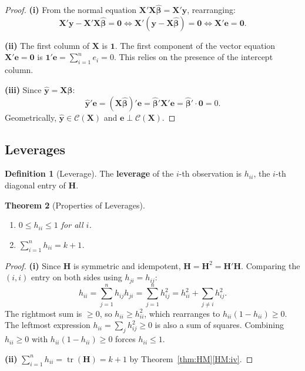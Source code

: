 \documentclass[14pt]{extarticle}
\theoremstyle{plain}
\newtheorem{theorem}{Theorem}[section]
\theoremstyle{definition}
\newtheorem{definition}[theorem]{Definition}
\theoremstyle{remark}
\DeclareMathOperator\tr{tr}
\newcommand{\bX}{\mathbf{X}}
\newcommand{\by}{\mathbf{y}}
\def\bb{\boldsymbol{\beta}}
\newcommand{\bH}{\mathbf{H}}
\newcommand{\bone}{\mathbf{1}}
\newcommand{\bzero}{\mathbf{0}}
\newcommand{\calC}{\mathcal{C}}
\begin{document}
\begin{proof}
\textbf{(i)} From the normal equation $\bX'\bX\hat{\bb} = \bX'\by$, rearranging:
\[
\bX'\by - \bX'\bX\hat{\bb} = \bzero \iff \bX'(\by - \bX\hat{\bb}) = \bzero \iff \bX'\mathbf{e} = \bzero.
\]

\textbf{(ii)} The first column of $\bX$ is $\bone$. The first component of the vector equation $\bX'\mathbf{e} = \bzero$ is $\bone'\mathbf{e} = \sum_{i=1}^{n} e_i = 0$. This relies on the presence of the intercept column.

\textbf{(iii)} Since $\hat{\by} = \bX\hat{\bb}$:
\[
\hat{\by}'\mathbf{e} = (\bX\hat{\bb})'\mathbf{e} = \hat{\bb}'\bX'\mathbf{e} = \hat{\bb}' \cdot \bzero = 0.
\]
Geometrically, $\hat{\by} \in \calC(\bX)$ and $\mathbf{e} \perp \calC(\bX)$.
\end{proof}

\subsection{Leverages}

\begin{definition}[Leverage]\label{def:leverage}
The \textbf{leverage} of the $i$-th observation is $h_{ii}$, the $i$-th diagonal entry of $\bH$.
\end{definition}

\begin{theorem}[Properties of Leverages]\label{thm:leverage}
\leavevmode
\begin{enumerate}[label=\textup{(\roman*)}]
\item\label{lev:i} $0 \leqslant h_{ii} \leqslant 1$ for all $i$.
\item $\sum_{i=1}^{n} h_{ii} = k + 1$.
\end{enumerate}
\end{theorem}

\begin{proof}
\textbf{(i)} Since $\bH$ is symmetric and idempotent, $\bH = \bH^2 = \bH'\bH$. Comparing the $(i, i)$ entry on both sides using $h_{ji} = h_{ij}$:
\[
h_{ii} = \sum_{j=1}^{n} h_{ij} h_{ji} = \sum_{j=1}^{n} h_{ij}^2 = h_{ii}^2 + \sum_{j \neq i} h_{ij}^2.
\]
The rightmost sum is $\geqslant 0$, so $h_{ii} \geqslant h_{ii}^2$, which rearranges to $h_{ii}(1 - h_{ii}) \geqslant 0$. The leftmost expression $h_{ii} = \sum_j h_{ij}^2 \geqslant 0$ is also a sum of squares. Combining $h_{ii} \geqslant 0$ with $h_{ii}(1 - h_{ii}) \geqslant 0$ forces $h_{ii} \leqslant 1$.

\textbf{(ii)} $\sum_{i=1}^{n} h_{ii} = \tr(\bH) = k + 1$ by Theorem~\ref{thm:HM}\ref{HM:iv}.
\end{proof}
\end{document}
